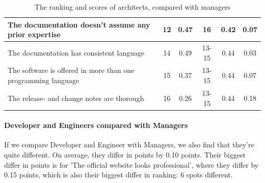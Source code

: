 \documentclass{article}
\begin{document}
\begin{table}[H]
\begin{tabularx}{\columnwidth}{X|c:c|c:c|c}
The documentation doesn't assume any prior expertise                  &        12 & 0.47       &           16 & 0.42           & 0.07  \\ \hline
The documentation has consistent language                             &        14 & 0.49       &        13-15 & 0.44           & 0.03  \\ \hline
The software is offered in more than one programming language         &        15 & 0.37       &        13-15 & 0.44           & 0.07  \\ \hline
The release- and change notes are thorough                            &        16 & 0.26       &        13-15 & 0.44           & 0.18  \\ \hline
\end{tabularx}
\caption{The ranking and scores of architects, compared with managers}
\label{tab:arch-devs}
\end{table}

\paragraph{Developer and Engineers compared with Managers}

If we compare Developer and Engineer with Managers, we also find that
they're quite different. On average, they differ in points by 0.10
points. Their biggest differ in points is for 'The official website
looks professional', where they differ by 0.15 points, which is also
their biggest differ in ranking: 6 spots different.
\end{document}
